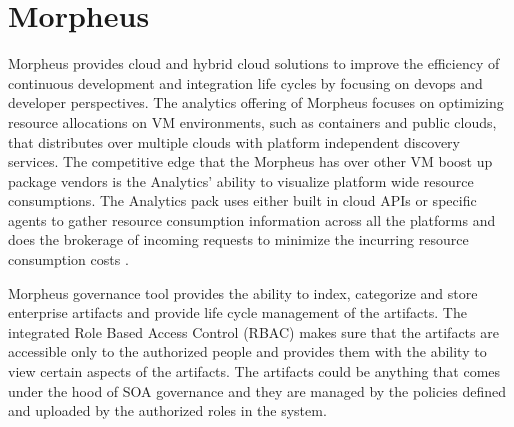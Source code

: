 \section{Morpheus}

Morpheus provides cloud and hybrid cloud solutions to improve the efficiency of continuous development and integration life cycles by focusing on devops and developer perspectives. The analytics offering of Morpheus focuses on optimizing resource allocations on VM environments, such as containers and public clouds, that distributes over multiple clouds with platform independent discovery services. The competitive edge that the Morpheus has over other VM boost up package vendors is the Analytics’ ability to visualize platform wide resource consumptions. The Analytics pack uses either built in cloud APIs or specific agents to gather resource consumption information across all the platforms and does the brokerage of incoming requests to minimize the incurring resource consumption costs \cite{hid-sp18-416-www-morpheus-product-guide}.

Morpheus governance tool provides the ability to index, categorize and store enterprise artifacts and provide life cycle management of the artifacts. The integrated Role Based Access Control (RBAC) makes sure that the artifacts are accessible only to the authorized people and provides them with the ability to view certain aspects of the artifacts. The artifacts could be anything that comes under the hood of SOA governance \cite{hid-sp18-416-www-soa-governance-wikipedia} and they are managed by the policies defined and uploaded by the authorized roles in the system.
